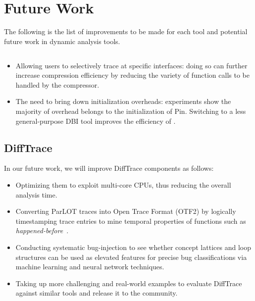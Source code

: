 \section{Future Work}
The following is the list of improvements to be made for each tool and potential future work in dynamic analysis tools.

\subsection{\parlot}
\begin{itemize}
  \item Allowing users to selectively trace at specific interfaces: doing so can further increase compression efficiency
  by reducing the variety of function calls to be handled by
  the compressor.
  \item The need to bring down initialization overheads: experiments show the majority of overhead belongs to the initialization of Pin. Switching to a less general-purpose DBI tool improves the efficiency of \parlot.
\end{itemize}
\subsection{DiffTrace}
In our future work, we will improve DiffTrace components as follows:
%
\begin{itemize}
  \item Optimizing them to exploit multi-core CPUs, thus reducing the overall analysis time.
  \item Converting ParLOT traces into Open Trace Format (OTF2) by logically timestamping trace entries to mine temporal properties of functions such as \textit{happened-before}~\cite{lamport}.
  \item Conducting systematic bug-injection to see whether concept lattices and loop structures can be used as elevated features for precise bug classifications via machine learning and neural network techniques.
  \item Taking up more challenging and real-world examples to evaluate DiffTrace against similar tools and release it to the community.
\end{itemize}
